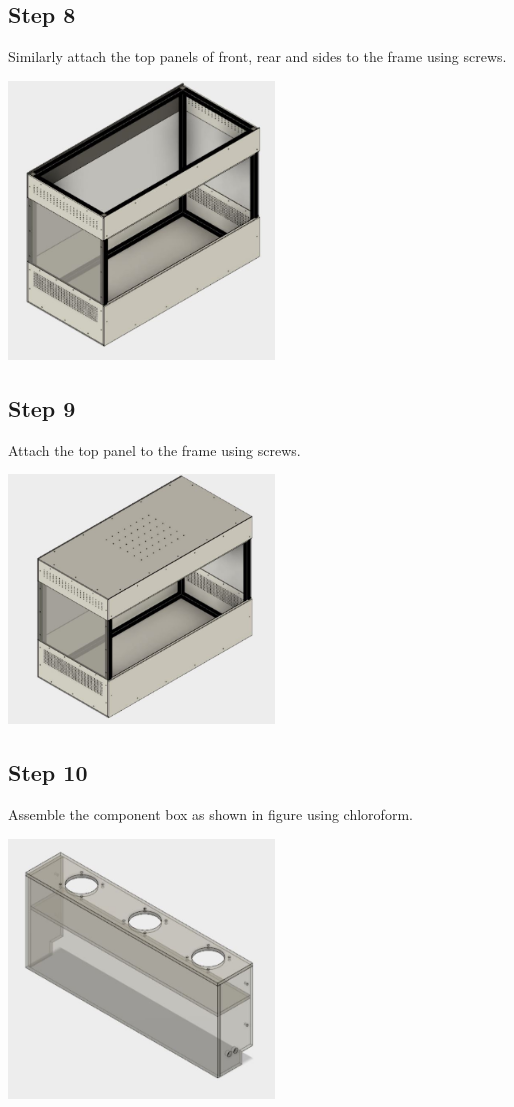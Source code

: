 \documentclass[a4paper,12pt,oneside]{book}
\begin{document}
\subsection*{Step 8}
Similarly attach the top panels of front, rear and sides to the frame using screws.\\
\begin{center}
  \includegraphics[width=200pt]{8}
  \end{center}
\subsection*{Step 9}
Attach the top panel to the frame using screws.\\
\begin{center}
  \includegraphics[width=200pt]{9}
  \end{center}
\subsection*{Step 10}
Assemble the component box as shown in figure using chloroform.\\
\begin{center}
  \includegraphics[width=200pt]{10}
  \end{center}
\end{document}
